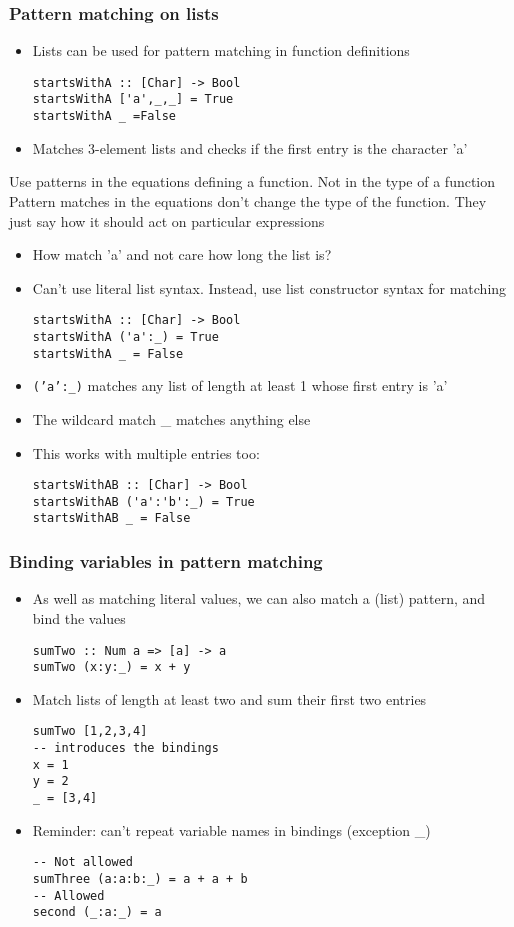 \documentclass{article}[18pt]
\begin{document}
\subsubsection{Pattern matching on lists}
\begin{itemize}
	\item Lists can be used for pattern matching in function definitions
\begin{verbatim}
startsWithA :: [Char] -> Bool
startsWithA ['a',_,_] = True
startsWithA _ =False
\end{verbatim}
	\item Matches 3-element lists and checks if the first entry is the character 'a'
\end{itemize}
\begin{important}[Careful]
Use patterns in the equations defining a function. Not in the type of a function\\
Pattern matches in the equations don't change the type of the function. They just say how it should act on particular expressions
\end{important}
\begin{itemize}
	\item How match 'a' and not care how long the list is?
	\item Can't use literal list syntax. Instead, use list constructor syntax for matching
\begin{verbatim}
startsWithA :: [Char] -> Bool
startsWithA ('a':_) = True
startsWithA _ = False
\end{verbatim}
	\item \texttt{('a':_)} matches any list of length at least 1 whose first entry is 'a'
	\item The wildcard match \_ matches anything else
	\item This works with multiple entries too:
\begin{verbatim}
startsWithAB :: [Char] -> Bool
startsWithAB ('a':'b':_) = True
startsWithAB _ = False
\end{verbatim}
\end{itemize}
\subsubsection{Binding variables in pattern matching}
\begin{itemize}
	\item As well as matching literal values, we can also match a (list) pattern, and bind the values
\begin{verbatim}
sumTwo :: Num a => [a] -> a
sumTwo (x:y:_) = x + y
\end{verbatim}
	\item Match lists of length at least two and sum their first two entries
\begin{verbatim}
sumTwo [1,2,3,4]
-- introduces the bindings
x = 1
y = 2
_ = [3,4]
\end{verbatim}
\item Reminder: can't repeat variable names in bindings (exception \_)
\begin{verbatim}
-- Not allowed
sumThree (a:a:b:_) = a + a + b
-- Allowed
second (_:a:_) = a
\end{verbatim}
\end{itemize}
\end{document}
